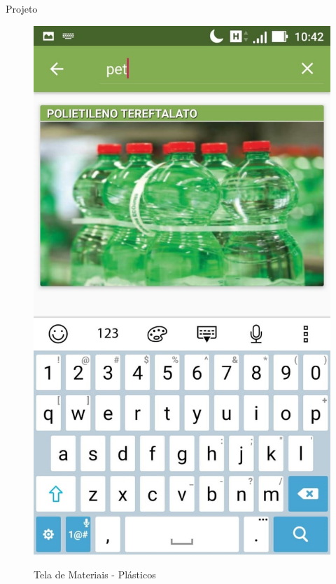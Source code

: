 \documentclass[
	12pt,				%
	openany,			%
	twoside,			%
	a4paper,			%
	english,			%
	french,				%
	spanish,			%
	brazil				%
	]{abntex2}
\begin{document}
\begin{chapter}{Projeto}
\begin{figure}[htb]
\begin{minipage}{0.45\textwidth}
     \label{fig:tela_material_act_1}
  \end{minipage}
  \hfill
  \begin{minipage}{0.45\textwidth}
    \centering
    \caption{Tela de Materiais -  Plásticos}
    \includegraphics[scale=0.35]{media/tela_material_act_2.jpg}
     \label{fig:tela_material_act_2}
  \end{minipage}
\end{figure}


\end{chapter}
\end{document}
